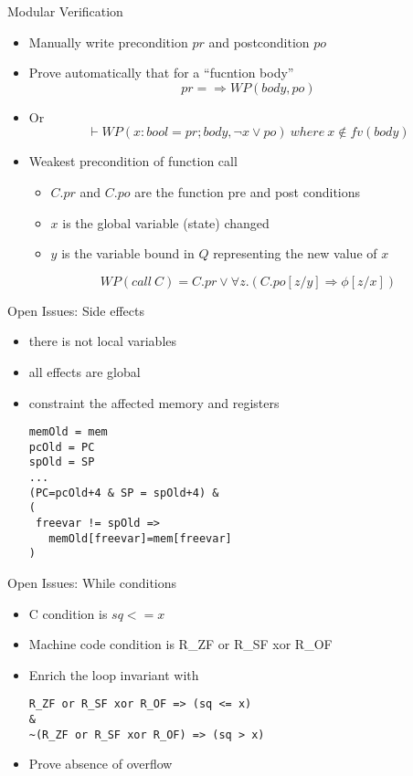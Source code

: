 \documentclass{beamer}
\begin{document}
\begin{frame}{Modular Verification}

\begin{itemize}
  \item Manually write precondition $pr$ and postcondition $po$
  \item Prove automatically that for a ``fucntion body''
\[
  pr =\Rightarrow WP(body, po)
\]
 \item Or
\[
  \vdash  WP(x:bool=pr;body, \neg x \vee po)
  \ where \ x \not \in fv(body)
\]
 \item Weakest precondition of function call
   \begin{itemize}
     \item $C.pr$ and $C.po$ are the function pre and post conditions
     \item $x$ is the global variable (state) changed
     \item $y$ is the variable bound in $Q$ representing the new value of $x$
   \end{itemize}
\[
 WP(call\ C) = C.pr \vee \forall z.(C.po[z/y] \Rightarrow \phi[z/x])
\]  
\end{itemize}

\end{frame}

\begin{frame}[fragile]{Open Issues: Side effects}
\begin{itemize}
  \item there is not local variables
  \item all effects are global
  \item constraint the affected memory and registers
  \begin{lstlisting}
memOld = mem
pcOld = PC
spOld = SP
...
(PC=pcOld+4 & SP = spOld+4) &
(
 freevar != spOld =>
   memOld[freevar]=mem[freevar]
)
  \end{lstlisting}
\end{itemize}
\end{frame}

\begin{frame}[fragile]{Open Issues: While conditions}
\begin{itemize}
  \item C condition is $sq<=x$
  \item Machine code condition is R\_ZF or R\_SF xor R\_OF
  \item Enrich the loop invariant with
  \begin{lstlisting}
R_ZF or R_SF xor R_OF => (sq <= x)
&
~(R_ZF or R_SF xor R_OF) => (sq > x)
  \end{lstlisting}
  \item Prove absence of overflow
\end{itemize}
\end{frame}
\end{document}
